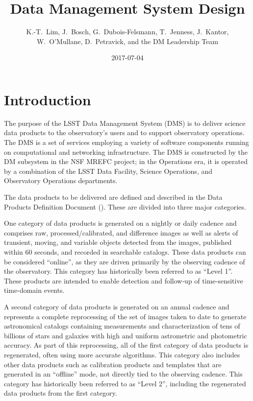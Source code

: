 \documentclass[DM,toc]{lsstdoc}
\title{Data Management System Design}
\author{
  K.-T.~Lim,
  J.~Bosch,
  G.~Dubois-Felsmann,
  T.~Jenness,
  J.~Kantor,
  W.~O'Mullane,
  D.~Petravick,
  and
  the DM Leadership Team}
\date{2017-07-04}
\begin{document}
\maketitle

\section{Introduction}\label{introduction}

The purpose of the LSST Data Management System (DMS) is to deliver science data
products to the observatory's users and to support observatory operations.  The
DMS is a set of services employing a variety of software components running on
computational and networking infrastructure.  The DMS is constructed by the DM
subsystem in the NSF MREFC project; in the Operations era, it is operated by a
combination of the LSST Data Facility, Science Operations, and Observatory
Operations departments.

The data products to be delivered are defined and described in the Data
Products Definition Document (). These are divided into three
major categories.

One category of data products is generated on a nightly or daily cadence
and comprises raw, processed/calibrated, and difference images as well as alerts
of transient, moving, and variable objects detected from the images,
published within 60 seconds, and recorded in searchable catalogs. These
data products can be considered ``online'', as they are driven primarily
by the observing cadence of the observatory. This category has
historically been referred to as ``Level 1''.  These products are intended to
enable detection and follow-up of time-sensitive time-domain events.

A second category of data products is generated on an annual cadence and
represents a complete reprocessing of the set of images taken to date to
generate astronomical catalogs containing measurements and
characterization of tens of billions of stars and galaxies with high and
uniform astrometric and photometric accuracy. As part of this
reprocessing, all of the first category of data products is regenerated,
often using more accurate algorithms. This category also includes other
data products such as calibration products and templates that are
generated in an ``offline'' mode, not directly tied to the observing
cadence. This category has historically been referred to as ``Level 2'',
including the regenerated data products from the first category.
\end{document}

